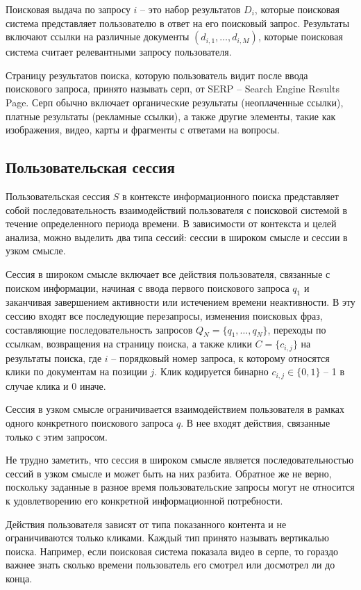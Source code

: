 \documentclass[diploma]{nanolab2015}
\begin{document}
Поисковая выдача по запросу $i$ -- это набор результатов $D_i$, которые поисковая система представляет пользователю в ответ на его поисковый запрос. Результаты включают ссылки на различные документы $(d_{i,1}, \dots, d_{i, M})$, которые поисковая система считает релевантными запросу пользователя.

Страницу результатов поиска, которую пользователь видит после ввода поискового запроса, принято называть серп, от SERP -- Search Engine Results Page. Серп обычно включает органические результаты (неоплаченные ссылки), платные результаты (рекламные ссылки), а также другие элементы, такие как изображения, видео, карты и фрагменты с ответами на вопросы.

\subsection{Пользовательская сессия}

Пользовательская сессия $S$ в контексте информационного поиска представляет собой последовательность взаимодействий пользователя с поисковой системой в течение определенного периода времени. В зависимости от контекста и целей анализа, можно выделить два типа сессий: сессии в широком смысле и сессии в узком смысле.

Сессия в широком смысле включает все действия пользователя, связанные с поиском информации, начиная с ввода первого поискового запроса $q_1$ и заканчивая завершением активности или истечением времени неактивности. В эту сессию входят все последующие перезапросы, изменения поисковых фраз, составляющие последовательность запросов $Q_N = \{q_1, \dots, q_N\}$, переходы по ссылкам, возвращения на страницу поиска, а также клики $C = \{c_{i,j}\}$ на результаты поиска, где $i$ -- порядковый номер запроса, к которому относятся клики по документам на позиции $j$. Клик кодируется бинарно $c_{i,j} \in \{0, 1\}$ -- 1 в случае клика и 0 иначе.

Сессия в узком смысле ограничивается взаимодействием пользователя в рамках одного конкретного поискового запроса $q$. В нее входят действия, связанные только с этим запросом.

Не трудно заметить, что сессия в широком смысле является последовательностью сессий в узком смысле и может быть на них разбита. Обратное же не верно, поскольку заданные в разное время пользовательские запросы могут не относится к удовлетворению его конкретной информационной потребности.

Действия пользователя зависят от типа показанного контента и не ограничиваются только кликами. Каждый тип принято называть вертикалью поиска. Например, если поисковая система показала видео в серпе, то гораздо важнее знать сколько времени пользователь его смотрел или досмотрел ли до конца.
\end{document}
